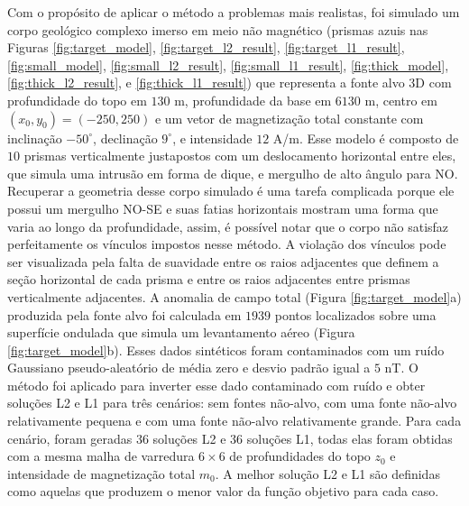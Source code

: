 Com o propósito de aplicar o método a problemas mais realistas, foi simulado um corpo geológico complexo imerso em meio não magnético (prismas azuis nas Figuras 
\ref{fig:target_model}, \ref{fig:target_l2_result}, \ref{fig:target_l1_result},
\ref{fig:small_model}, \ref{fig:small_l2_result}, \ref{fig:small_l1_result}, 
\ref{fig:thick_model}, \ref{fig:thick_l2_result}, e \ref{fig:thick_l1_result})
que representa a fonte alvo 3D com profundidade do topo em $130$ m, profundidade da base em $6130$ m, centro em $ (x_0, y_0) = (-250, 250) $ e um vetor de magnetização total constante com inclinação $-50^{\circ}$, 
declinação $9^{\circ}$, e intensidade $12$ A/m. 
Esse modelo é composto de $ 10 $ prismas verticalmente justapostos com um deslocamento horizontal entre eles, que simula uma intrusão em forma de dique, e mergulho de alto ângulo para NO.
Recuperar a geometria desse corpo simulado é uma tarefa complicada porque ele possui um mergulho NO-SE e suas fatias horizontais mostram uma forma que varia ao longo da profundidade, assim, é possível notar que o corpo não satisfaz perfeitamente os vínculos impostos nesse método.
A violação dos vínculos pode ser visualizada pela falta de suavidade entre os raios adjacentes que definem a seção horizontal de cada prisma e entre os raios adjacentes entre prismas verticalmente adjacentes.
A anomalia de campo total (Figura \ref{fig:target_model}a) produzida pela fonte alvo foi calculada em $1939$ pontos localizados sobre uma superfície ondulada que simula um levantamento aéreo (Figura \ref{fig:target_model}b). Esses dados sintéticos foram contaminados com um ruído Gaussiano pseudo-aleatório de média zero e desvio padrão igual a $5$ nT.
O método foi aplicado para inverter esse dado contaminado com ruído e obter soluções L2 e L1 para três cenários: sem fontes não-alvo, 
com uma fonte não-alvo relativamente pequena e com uma fonte não-alvo relativamente grande.
Para cada cenário, foram geradas $36$ soluções L2 e $36$ soluções L1, 
todas elas foram obtidas com a mesma malha de varredura $6 \times 6$ de profundidades do topo $z_{0}$ e intensidade de magnetização total $m_{0}$.
A melhor solução L2 e L1 são definidas como aquelas que produzem o menor valor da função objetivo para cada caso.

